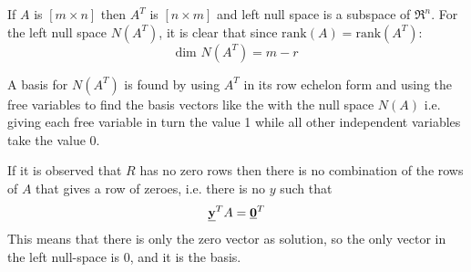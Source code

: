 \documentclass[10pt,a4paper]{article}
\begin{document}
If $A$ is $[m \times n]$ then $A^T$ is $[n \times m]$ and left null space is a subspace of $\Re^n$.
For the left null space $N(A^T)$, it is clear that since $\text{rank}(A)=\text{rank}(A^T)$:
$$
    \text{dim }N(A^T) = m-r
$$

A basis for $N(A^T)$ is found by using $A^T$ in its row echelon form and using the free variables to
find the basis vectors like the with the null space $N(A)$ i.e. giving each free variable in turn
the value 1 while all other independent variables take the value 0.

If it is observed that $R$ has no zero rows then there is no combination of the rows of $A$ that
gives a row of zeroes, i.e. there is no $y$ such that
$$
\textbf{\underline{y}}^T A = \textbf{\underline{0}}^T
$$
This means that there is only the zero vector as solution, so the only vector in the left null-space is 0, and it is the basis.
\end{document}
